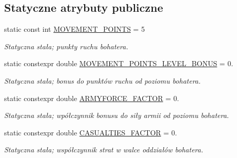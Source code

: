 \subsection*{Statyczne atrybuty publiczne}
\begin{DoxyCompactItemize}
\item 
\mbox{\label{classmodel_1_1Hero_ab8a93189dfa42527906e6d66cdfd2eef}} 
static const int \hyperlink{classmodel_1_1Hero_ab8a93189dfa42527906e6d66cdfd2eef}{M\+O\+V\+E\+M\+E\+N\+T\+\_\+\+P\+O\+I\+N\+TS} = 5
\begin{DoxyCompactList}\small\item\em Statyczna stała; punkty ruchu bohatera. \end{DoxyCompactList}\item 
\mbox{\label{classmodel_1_1Hero_a24257807504890a7d302f7f2a4c66298}} 
static constexpr double \hyperlink{classmodel_1_1Hero_a24257807504890a7d302f7f2a4c66298}{M\+O\+V\+E\+M\+E\+N\+T\+\_\+\+P\+O\+I\+N\+T\+S\+\_\+\+L\+E\+V\+E\+L\+\_\+\+B\+O\+N\+US} = 0.
\begin{DoxyCompactList}\small\item\em Statyczna stała; bonus do punktów ruchu od poziomu bohatera. \end{DoxyCompactList}\item 
\mbox{\label{classmodel_1_1Hero_a2d17ca3068a51a516a7b3782da536366}} 
static constexpr double \hyperlink{classmodel_1_1Hero_a2d17ca3068a51a516a7b3782da536366}{A\+R\+M\+Y\+F\+O\+R\+C\+E\+\_\+\+F\+A\+C\+T\+OR} = 0.
\begin{DoxyCompactList}\small\item\em Statyczna stała; wpółczynnik bonusu do siły armii od poziomu bohatera. \end{DoxyCompactList}\item 
\mbox{\label{classmodel_1_1Hero_aeb81d3ed857c6f2d0cb3e15ce9931bdd}} 
static constexpr double \hyperlink{classmodel_1_1Hero_aeb81d3ed857c6f2d0cb3e15ce9931bdd}{C\+A\+S\+U\+A\+L\+T\+I\+E\+S\+\_\+\+F\+A\+C\+T\+OR} = 0.
\begin{DoxyCompactList}\small\item\em Statyczna stała; współczynnik strat w walce oddziałów bohatera. \end{DoxyCompactList}\end{DoxyCompactItemize}


